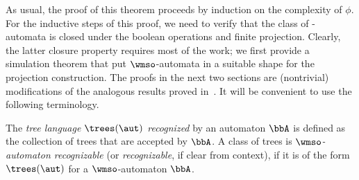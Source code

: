 As usual, the proof of this theorem proceeds by induction on the complexity of
$\phi$.
For the inductive steps of this proof, we need to verify that the class of
\wmso-automata is closed under the boolean operations and finite projection.
Clearly, the latter closure property requires most of the work; we first
provide a simulation theorem that put $\wmso$-automata in a suitable shape
for the projection construction.
The proofs in the next two sections are (nontrivial) modifications of the
analogous results proved in~\cite{DBLP:conf/lics/FacchiniVZ13}.
%
It will be convenient to use the following terminology.

\begin{definition}
The \emph{tree language $\trees(\aut)$ recognized} by an automaton $\bbA$ is
defined as the collection of trees that are accepted by $\bbA$.
A class of trees is \emph{$\wmso$-automaton recognizable} (or
\emph{recognizable}, if clear from context), if it is of the form
$\trees(\aut)$ for a $\wmso$-automaton $\bbA$.
\end{definition}